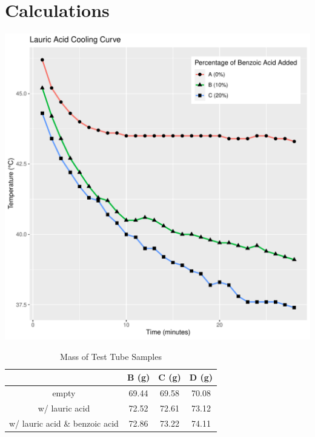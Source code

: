 \documentclass[12pt]{article}\usepackage[]{graphicx}\usepackage[]{xcolor}
\makeatletter
\def\maxwidth{ %
  \ifdim\Gin@nat@width>\linewidth
    \linewidth
  \else
    \Gin@nat@width
  \fi
}
\newenvironment{knitrout}{}{} %
\makeatother
\begin{document}
    \section*{Calculations}
\begin{knitrout}
\color{fgcolor}
\includegraphics[width=\maxwidth]{figure/coolingPlot-1} 
\end{knitrout}
      \begin{table}[h]
        \centering
        \caption{Mass of Test Tube Samples}
        \begin{tabular}{c|ccc}
            & B (g) & C (g) & D (g)\\
            \hline
            empty & 69.44 & 69.58 & 70.08\\
            w/ lauric acid & 72.52 & 72.61 & 73.12\\
            w/ lauric acid \& benzoic acid & 72.86 & 73.22 & 74.11
        \end{tabular}
    \end{table}
\end{document}
